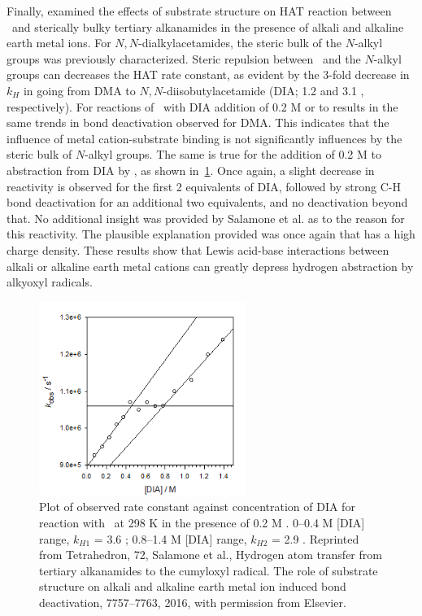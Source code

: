 Finally, \citet{Salamone2016} examined the effects of substrate structure on HAT
reaction between \cumo\ and sterically bulky tertiary alkanamides in the
presence of alkali and alkaline earth metal ions. For $N,N$-dialkylacetamides,
the steric bulk of the $N$-alkyl groups was previously
characterized.\cite{Salamone2014} Steric repulsion between \cumo\ and the
$N$-alkyl groups can decreases the HAT rate constant, as evident by the 3-fold
decrease in $k_H$ in going from DMA to $N,N$-diisobutylacetamide (DIA; 1.2
and 3.1 \Ms, respectively). For reactions of \cumo\ with DIA addition of
0.2 M  or  to results in the same trends in 
bond deactivation observed for DMA. This indicates that the influence of metal
cation-substrate binding is not significantly influences by the steric bulk of
$N$-alkyl groups.  The same is true for the addition of 0.2 M  to
abstraction from DIA by \cumo, as shown in~\ref{fig:k-dia-mg}. Once again, a
slight decrease in reactivity is observed for the first 2 equivalents of DIA,
followed by strong C-H bond deactivation for an additional two equivalents, and
no deactivation beyond that. No additional insight was provided by Salamone et
al. as to the reason for this reactivity. The plausible explanation provided was
once again that  has a high charge density. These results show that
Lewis acid-base interactions between alkali or alkaline earth metal cations can
greatly depress hydrogen abstraction by alkyoxyl radicals.

\begin{figure}[!htbp]
  \includegraphics[width=0.6\textwidth]{figures/exptdia-mg.png}
  \caption[Plot of observed rate constant against concentration of DIA for
  reaction with \cumo\ at 298 K in the presence of 0.2 M .]{Plot
	  of observed rate constant against concentration of DIA for reaction
	  with \cumo\ at 298 K in the presence of 0.2 M . 0--0.4
	  M [DIA] range, $k_{H1}$ = 3.6 \Ms; 0.8--1.4 M [DIA] range,
	  $k_{H2}$ = 2.9 \Ms.  Reprinted from Tetrahedron, 72, Salamone et
  al., Hydrogen atom transfer from tertiary alkanamides to the cumyloxyl
  radical. The role of substrate structure on alkali and alkaline earth metal
  ion induced  bond deactivation, 7757--7763, 2016, with permission
  from Elsevier.} \label{fig:k-dia-mg}
\end{figure}

